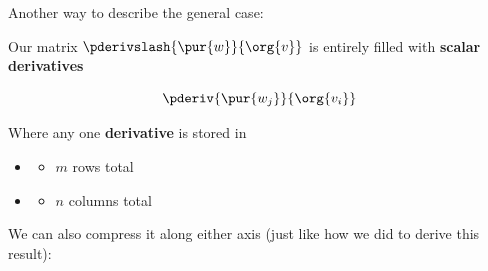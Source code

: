         Another way to describe the general case:\\
        
        \begin{notation}
            Our matrix $\pderivslash{ \pur{w} }{ \org{v} }$ is entirely filled with \textbf{scalar derivatives}
            
            \begin{equation}
                \pderiv {\pur{w_j}} { \org{v_i} }
            \end{equation}
            
            Where any one \textbf{derivative} is stored in
            
            \begin{itemize}
                \item {}
                
                    \begin{itemize}
                        \item $m$ rows total
                    \end{itemize}
                    
                \item {}
                
                    \begin{itemize}
                        \item $n$ columns total
                    \end{itemize}
            \end{itemize}
        \end{notation}
        
        We can also compress it along either axis (just like how we did to derive this result):\\
        
